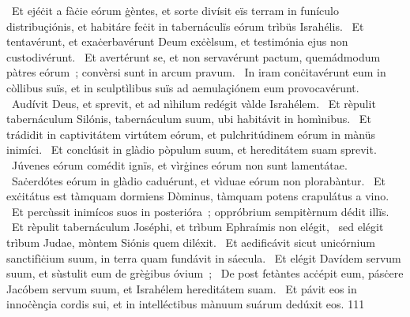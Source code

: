 {~Et ejéċit a fàċie eórum ġèntes, et sorte divísit eïs terram in funículo distribuçiónis, et habitáre feċit in tabernáculïs eórum trìbüs Israhélis.
~Et tentavérunt, et exaċerbavérunt Deum exċèlsum, et testimónia ejus non custodivérunt.
~Et avertérunt se, et non servavérunt pactum, quemádmodum pàtres eórum~; convèrsi sunt in arcum pravum.
~In iram conċitavérunt eum in còllibus suïs, et in sculptìlibus suïs ad aemulaçiónem eum provocavérunt.
~Audívit Deus, et sprevit, et ad nìhilum redégit vàlde Israhélem.
~Et rèpulit tabernáculum Silónis, tabernáculum suum, ubi habitávit in homìnibus.
~Et trádidit in captivitátem virtútem eórum, et pulchritúdinem eórum in mànüs inimíci.
~Et conclúsit in glàdio pòpulum suum, et hereditátem suam sprevit.
~Júvenes eórum comédit ignïs, et vìrġines eórum non sunt lamentátae.
~Saċerdótes eórum in glàdio caduérunt, et vìduae eórum non plorabàntur.
~Et exċitátus est tàmquam dormiens Dòminus, tàmquam potens crapulátus a vino.
~Et percùssit inimícos suos in posterióra~; oppróbrium sempitèrnum dédit illïs.
~Et rèpulit tabernáculum Joséphi, et trìbum Ephraímis non elégit,
~sed elégit trìbum Judae, mòntem Siónis quem diléxit.
~Et aedificávit sicut unicórnium sanctifìċium suum, in terra quam fundávit in sáecula.
~Et elégit Davídem servum suum, et sùstulit eum de grèġibus óvium~;
~De post fetàntes acċépit eum, pásċere Jacóbem servum suum, et Israhélem hereditátem suam.
~Et pávit eos in innoċènçia cordis sui, et in intelléctibus mànuum suárum dedúxit eos.
}
{11}{1}
